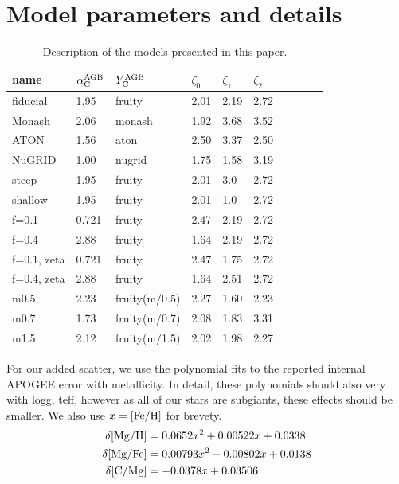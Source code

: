 \documentclass[fleqn,
usenatbib]{mnras}
\begin{document}

\appendix


\section{Model parameters and details}

\begin{table}
	\centering
    \caption[]{Description of the models presented in this paper.}
	\label{tab:model_parameters}

	\begin{tabular}{l l l l l l l l l l}
		\hline
            name & $\alpha_{\rm C}^{\rm AGB}$ & $Y_{\rm C}^{\rm AGB}$ & $\zeta_0$ & $\zeta_1$ & $\zeta_2$ \\ 
            \hline
            fiducial & 1.95 & fruity & 2.01 & 2.19 & 2.72 \\
            Monash & 2.06 & monash & 1.92 & 3.68 & 3.52 \\
            ATON & 1.56 & aton & 2.50 & 3.37 & 2.50 \\
            NuGRID & 1.00 & nugrid & 1.75 & 1.58 & 3.19 \\
            steep & 1.95 & fruity & 2.01 & 3.0 & 2.72 \\
            shallow & 1.95 & fruity & 2.01 & 1.0 & 2.72 \\
            f=0.1 & 0.721 & fruity & 2.47 & 2.19 & 2.72  \\
            f=0.4 & 2.88 & fruity & 1.64 & 2.19 & 2.72 \\
            f=0.1, zeta & 0.721 & fruity & 2.47 & 1.75 & 2.72  \\
            f=0.4, zeta & 2.88 & fruity & 1.64 & 2.51 & 2.72 \\
            m0.5 & 2.23 & fruity(m/0.5)  & 2.27 & 1.60 & 2.23 \\
            m0.7 & 1.73 & fruity(m/0.7) & 2.08 & 1.83 & 3.31 \\
            m1.5 & 2.12 & fruity(m/1.5) & 2.02 & 1.98 & 2.27 \\
		\hline
	\end{tabular}
\end{table}



For our added scatter, we use the polynomial fits to the reported internal APOGEE error with metallicity. In detail, these polynomials should also very with logg, teff, however as all of our stars are subgiants, these effects should be smaller. We also use $x={\rm [Fe/H]}$ for brevety.
\begin{subequations}
\begin{align}
    \delta {\rm [Mg/H]} &= 0.0652 x^2 + 0.00522 x + 0.0338 \\
    \delta {\rm [Mg/Fe]} &= 0.00793 x^2 - 0.00802 x + 0.0138 \\
    \delta {\rm [C/Mg]} &= -0.0378x + 0.03506 
\end{align}
\end{subequations}
\end{document}
